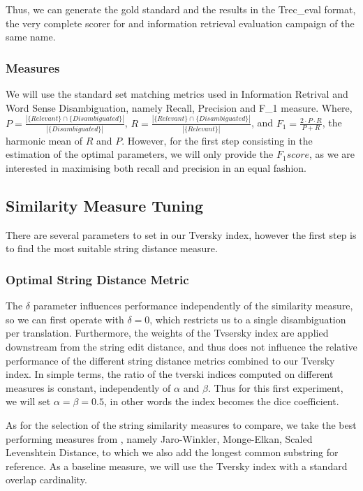 \documentclass[10pt, a4paper]{article}
\begin{document}
Thus, we can generate the gold standard and the results in the Trec\_eval format, the very complete scorer for and information retrieval evaluation campaign of the same name.

\subsubsection{Measures}
We will use the standard set matching metrics used in Information Retrival and Word Sense Disambiguation, namely Recall, Precision and F\_{1} measure. Where, \(P=\frac{|\{Relevant\}\cap\{Disambiguated\}|}{|\{Disambiguated\}|}\), \(R=\frac{|\{Relevant\}\cap\{Disambiguated\}|}{|\{Relevant\}|}\), and \(F_1 = \frac{2\cdot P \cdot R}{P + R} \), the harmonic mean of \(R\) and \(P\). However, for the first step consisting in the estimation of the optimal parameters, we will only provide the \(F_1 score\), as we are interested in maximising both recall and precision in an equal fashion.
\subsection{Similarity Measure Tuning}
There are several parameters to set in our Tversky index, however the first step is to find the most suitable string distance measure.

\subsubsection{Optimal String Distance Metric}
 The \(\delta\) parameter influences performance independently of the similarity measure, so we can first operate with \(\delta=0\), which restricts us to a single disambiguation per translation. Furthermore, the weights of the Tvsersky index are applied downstream from the string edit distance, and thus does not influence the relative performance of the different string distance metrics combined to our Tversky index. In simple terms, the ratio of the tverski indices computed on different measures is constant, independently of \(\alpha\) and \(\beta\).  Thus for this first experiment, we will set \(\alpha=\beta=0.5\), in other words the index becomes the dice coefficient.

As for the selection of the string similarity measures to compare, we take the best performing measures from \cite{Cohen2003}, namely Jaro-Winkler, Monge-Elkan, Scaled Levenshtein Distance, to which we also add the longest common substring for reference. As a baseline measure, we will use the Tversky index with a standard overlap cardinality.
\end{document}
